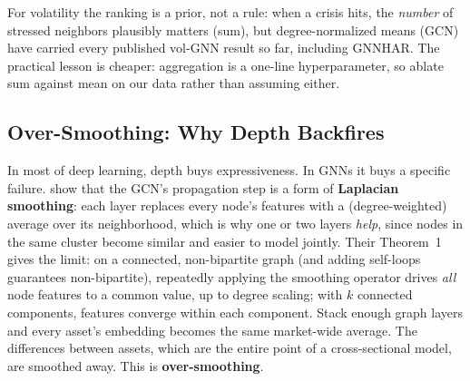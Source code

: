 \begin{projectconnection}
For volatility the ranking is a prior, not a rule: when a crisis hits, the \emph{number} of stressed neighbors plausibly matters (sum), but degree-normalized means (GCN) have carried every published vol-GNN result so far, including GNNHAR. The practical lesson is cheaper: aggregation is a one-line hyperparameter, so ablate sum against mean on our data rather than assuming either.
\end{projectconnection}

\subsection{Over-Smoothing: Why Depth Backfires}\label{sec:gnn:oversmoothing}

In most of deep learning, depth buys expressiveness. In GNNs it buys a specific failure. \citet{LiHanWu2018} show that the GCN's propagation step is a form of \textbf{Laplacian smoothing}: each layer replaces every node's features with a (degree-weighted) average over its neighborhood, which is why one or two layers \emph{help}, since nodes in the same cluster become similar and easier to model jointly. Their Theorem~1 gives the limit: on a connected, non-bipartite graph (and adding self-loops guarantees non-bipartite), repeatedly applying the smoothing operator drives \emph{all} node features to a common value, up to degree scaling; with $k$ connected components, features converge within each component. Stack enough graph layers and every asset's embedding becomes the same market-wide average. The differences between assets, which are the entire point of a cross-sectional model, are smoothed away. This is \textbf{over-smoothing}.

